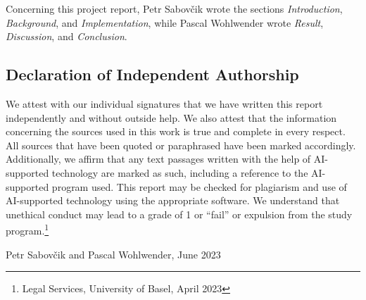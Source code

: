 \documentclass{article}
\begin{document}
Concerning this project report, Petr Sabovčik wrote the sections \textit{Introduction}, \textit{Background}, and \textit{Implementation}, while Pascal Wohlwender wrote \textit{Result}, \textit{Discussion}, and \textit{Conclusion}.

\subsection{Declaration of Independent Authorship}

We attest with our individual signatures that we have written this report independently and without outside
help. We also attest that the information concerning the sources used in this work is true and complete in every
respect. All sources that have been quoted or paraphrased have been marked accordingly.
Additionally, we affirm that any text passages written with the help of AI-supported technology are marked as
such, including a reference to the AI-supported program used.
This report may be checked for plagiarism and use of AI-supported technology using the appropriate software.
We understand that unethical conduct may lead to a grade of 1 or “fail” or expulsion from the study program.\footnote{Legal Services, University of Basel, April 2023}

\begin{flushright}
Petr Sabovčik and Pascal Wohlwender, June 2023
\end{flushright}
\end{document}
